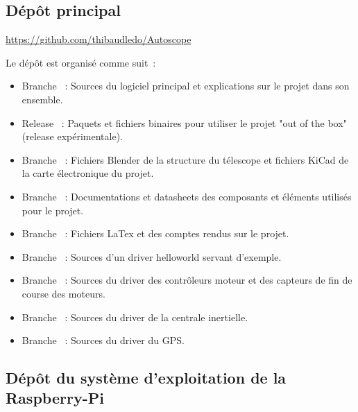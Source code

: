 \subsection{Dépôt principal}

\url{https://github.com/thibaudledo/Autoscope}

\vspace{1cm}

Le dépôt est organisé comme suit~:
\begin{itemize}[label=$\bullet$]
	\item Branche {\href{https://github.com/thibaudledo/Autoscope/tree/master}{}}~: Sources du logiciel principal et explications sur le projet dans son ensemble.
	\item Release {\href{https://github.com/thibaudledo/Autoscope/releases}{}}~: Paquets et fichiers binaires pour utiliser le projet "out of the box" (release expérimentale).
	\item Branche {\href{https://github.com/thibaudledo/Autoscope/tree/hardware}{}}~: Fichiers Blender de la structure du télescope et fichiers KiCad de la carte électronique du projet.
	\item Branche {\href{https://github.com/thibaudledo/Autoscope/tree/doc}{}}~: Documentations et datasheets des composants et éléments utilisés pour le projet.
	\item Branche {\href{https://github.com/thibaudledo/Autoscope/tree/latex}{}}~: Fichiers LaTex et  des comptes rendus sur le projet.
	\item Branche {\href{https://github.com/thibaudledo/Autoscope/tree/hello_mod}{}}~: Sources d'un driver helloworld servant d'exemple.
	\item Branche {\href{https://github.com/thibaudledo/Autoscope/tree/a4988_mod}{}}~: Sources du driver des contrôleurs moteur et des capteurs de fin de course des moteurs.
	\item Branche {\href{https://github.com/thibaudledo/Autoscope/tree/mpu9250_mod}{}}~: Sources du driver de la centrale inertielle.
	\item Branche {\href{https://github.com/thibaudledo/Autoscope/tree/mtk3339d}{}}~: Sources du driver du GPS.
	\end{itemize}

\newpage
\subsection{Dépôt du système d'exploitation de la Raspberry-Pi}

